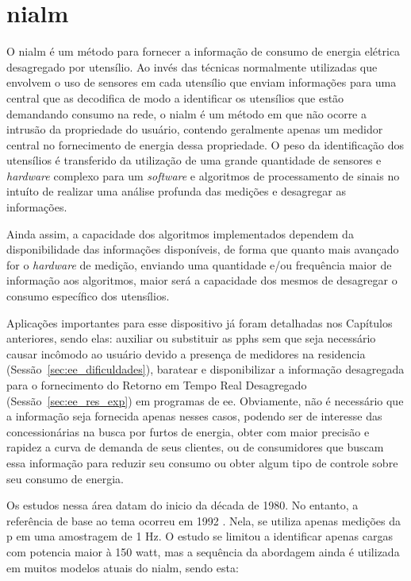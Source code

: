 \chapter[NIALM]{\acrlong{nialm}}
\label{cap:nialm}


O \gls{nialm} é um método para fornecer a informação de consumo de energia
elétrica desagregado por utensílio. Ao invés das técnicas normalmente utilizadas
que envolvem o uso de sensores em cada utensílio que enviam informações para uma
central que as decodifica de modo a identificar os utensílios que estão
demandando consumo na rede, o \gls{nialm} é um método em que não ocorre a
intrusão da propriedade do usuário, contendo geralmente apenas um medidor central no
fornecimento de energia dessa propriedade. O peso da identificação dos utensílios
é transferido da utilização de uma grande quantidade de sensores e
\emph{hardware} complexo para um \emph{software} e algoritmos de processamento
de sinais no intuíto de realizar uma análise profunda das medições e desagregar
as informações.

Ainda assim, a capacidade dos algoritmos implementados dependem da
disponibilidade das informações disponíveis, de forma que quanto mais avançado
for o \emph{hardware} de medição, enviando uma quantidade e/ou frequência maior de 
informação aos algoritmos, maior será a capacidade dos mesmos de desagregar o
consumo específico dos utensílios.

Aplicações importantes para esse dispositivo já foram detalhadas nos Capítulos
anteriores, sendo elas: auxiliar ou substituir as \glspl{pph} sem que seja
necessário causar incômodo ao usuário devido a presença de medidores na
residencia (Sessão~\ref{sec:ee_dificuldades}), baratear e disponibilizar a informação 
desagregada para o fornecimento do Retorno em Tempo Real Desagregado
(Sessão~\ref{sec:ee_res_exp}) em programas de \gls{ee}. Obviamente, não é
necessário que a informação seja fornecida apenas nesses casos, podendo ser de
interesse das concessionárias na busca por furtos de energia, obter com maior
precisão e rapidez a curva de demanda de seus clientes, ou de consumidores
que buscam essa informação para reduzir seu consumo ou obter algum tipo de
controle sobre seu consumo de energia.

Os estudos nessa área datam do inicio da década de 1980. No entanto, a
referência de base ao tema ocorreu em 1992 \cite{nilm_hart}. Nela, se
utiliza apenas medições da \gls{p} em uma amostragem de 1 Hz. O estudo se
limitou a identificar apenas cargas com potencia maior à 150
\acrshort{watt}, mas a sequência da abordagem ainda é utilizada em muitos modelos 
atuais do \gls{nialm}, sendo esta: 

